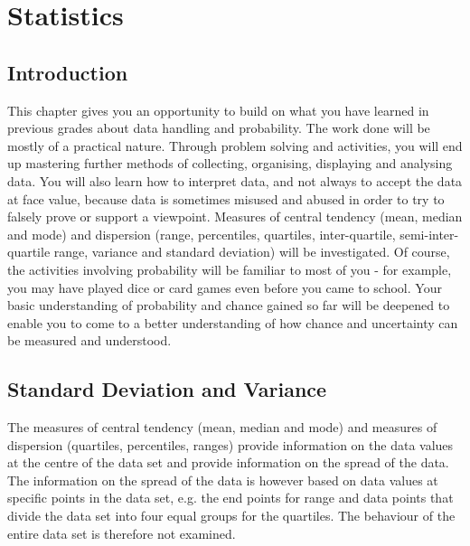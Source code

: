 \chapter{Statistics}
\label{m:s11}

\section{Introduction}
This chapter gives you an opportunity to build on what you have learned in previous grades about data handling and probability. The work done will be mostly  of a practical nature. Through problem solving and activities, you will end up mastering further methods of collecting, organising, displaying and analysing data. You will also learn how to interpret data, and not always to accept the data at face value, because data is sometimes misused and abused in order to try to falsely prove or support a viewpoint. Measures of central tendency (mean, median and mode) and dispersion (range, percentiles, quartiles, inter-quartile, semi-inter-quartile range, variance and standard deviation) will be investigated. Of course, the activities involving probability will be familiar to most of you - for example, you may have played dice or card games even before you came to school. Your basic understanding of probability and chance gained so far will be deepened to enable you to come to a better understanding of how chance and uncertainty can be measured and understood.  

\section{Standard Deviation and Variance}

The measures of central tendency (mean, median and mode) and measures of dispersion (quartiles, percentiles, ranges) provide information on the data values at the centre of the data set and provide information on the spread of the data. The information on the spread of the data is however based on data values at specific points in the data set, e.g. the end points for range and data points that divide the data set into four equal groups for the quartiles. The behaviour of the entire data set is therefore not examined.


